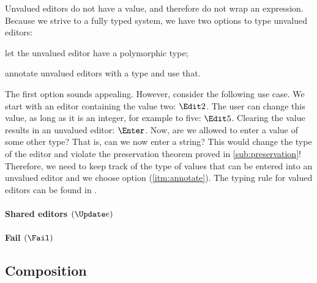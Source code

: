 Unvalued editors do not have a value,
and therefore do not wrap an expression.
Because we strive to a fully typed system,
we have two options to type unvalued editors:
\begin{enumerate*}
  \item let the unvalued editor have a polymorphic type;
  \item annotate unvalued editors with a type and use that. \label{itm:annotate}
\end{enumerate*}

The first option sounds appealing.
However, consider the following use case.
We start with an editor containing the value two: $\Edit 2$.
The user can change this value, as long as it is an integer,
for example to five: $\Edit 5$.
Clearing the value results in an unvalued editor: $\Enter$.
Now, are we allowed to enter a value of some other type?
That is, can we now enter a string?
This would change the type of the editor
and violate the preservation theorem proved in \autoref{sub:preservation}!
Therefore,
we need to keep track of the type of values that can be entered into an unvalued editor
and we choose option (\ref{itm:annotate}).
The typing rule for valued editors can be found in .



\paragraph{Shared editors $(\Update e)$}



\paragraph{Fail $(\Fail)$}



\subsection{Composition}


